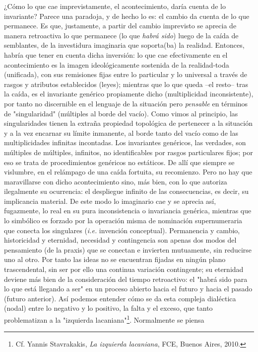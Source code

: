 ¿Cómo lo que cae imprevistamente, el acontecimiento, daría cuenta de lo
invariante? Parece una paradoja, y de hecho lo es: el cambio da cuenta
de lo que permanece. Es que, justamente, a partir del cambio imprevisto
se aprecia de manera retroactiva lo que permanece (lo que \emph{habrá
sido}) luego de la caída de semblantes, de la investidura imaginaria que
soporta(ba) la realidad. Entonces, habría que tener en cuenta dicha
inversión: lo que cae efectivamente en el acontecimiento es la imagen
ideológicamente sostenida de la realidad-toda (unificada), con sus
remisiones fijas entre lo particular y lo universal a través de rasgos y
atributos establecidos (leyes); mientras que lo que queda --el resto--
tras la caída, es el invariante genérico propiamente dicho
(multiplicidad inconsistente), por tanto no discernible en el lenguaje
de la situación pero \emph{pensable} en términos de "singularidad"
(múltiples al borde del vacío). Como vimos al principio, las
singularidades tienen la extraña propiedad topológica de pertenecer a la
situación y a la vez encarnar su límite inmanente, al borde tanto del
vacío como de las multiplicidades infinitas incontadas. Los invariantes
genéricos, las verdades, son múltiples de múltiples, infinitos, no
identificables por rasgos particulares fijos; por eso se trata de
procedimientos genéricos no estáticos. De allí que siempre se vislumbre,
en el relámpago de una caída fortuita, su recomienzo. Pero no hay que
maravillarse con dicho acontecimiento sino, más bien, con lo que
autoriza ilegalmente su ocurrencia: el despliegue infinito de las
consecuencias, es decir, su implicancia material. De este modo lo
imaginario cae y se aprecia así, fugazmente, lo real en su pura
inconsistencia o invariancia genérica, mientras que lo simbólico es
forzado por la operación misma de nominación supernumeraria que conecta
los singulares (\emph{i.e.} invención conceptual). Permanencia y cambio,
historicidad y eternidad, necesidad y contingencia son apenas dos modos
del pensamiento (de la praxis) que se conectan e invierten mutuamente,
sin reducirse uno al otro. Por tanto las ideas no se encuentran fijadas
en ningún plano trascendental, sin ser por ello una continua variación
contingente; su eternidad deviene más bien de la consideración del
tiempo retroactivo: el "habrá sido para lo que está llegando a ser" en
un proceso abierto hacia el futuro y hacia el pasado (futuro anterior).
Así podemos entender cómo se da esta compleja dialéctica (nodal) entre
lo negativo y lo positivo, la falta y el exceso, que tanto problematizan
a la "izquierda lacaniana"\footnote{Cf. Yannis Stavrakakis, \emph{La
  izquierda lacaniana}, FCE, Buenos Aires, 2010.}. Normalmente se piensa
